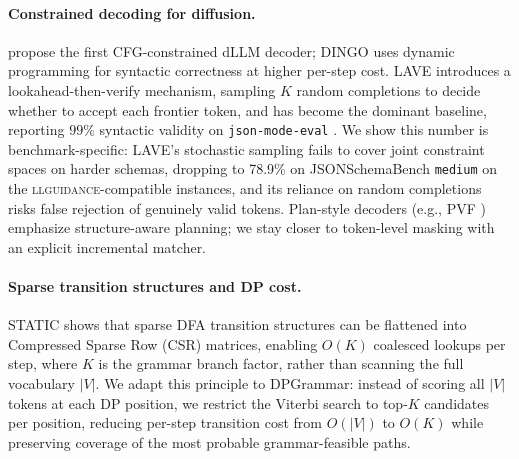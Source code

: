\paragraph{Constrained decoding for diffusion.}
\citet{cd4dllm} propose the first CFG-constrained dLLM decoder; DINGO \citep{suresh2025dingoconstrainedinferencediffusion} uses dynamic programming for syntactic correctness at higher per-step cost. LAVE \citep{zhang2026lookaheadthenverifyreliableconstraineddecoding} introduces a lookahead-then-verify mechanism, sampling $K$ random completions to decide whether to accept each frontier token, and has become the dominant baseline, reporting $99\%$ syntactic validity on \texttt{json-mode-eval} \citep{nousresearch2024jsonmodeeval}. We show this number is benchmark-specific: LAVE's stochastic sampling fails to cover joint constraint spaces on harder schemas, dropping to 78.9\% on JSONSchemaBench \citep{geng2025jsonschemabenchrigorousbenchmarkstructured} \texttt{medium} on the \textsc{llguidance}-compatible instances, and its reliance on random completions risks false rejection of genuinely valid tokens. Plan-style decoders (e.g., PVF \citep{li2026planverifyfillstructured}) emphasize structure-aware planning; we stay closer to token-level masking with an explicit incremental matcher.

\paragraph{Sparse transition structures and DP cost.}
STATIC \citep{su2026vectorizingtrieefficientconstrained} shows that sparse DFA transition structures can be flattened into Compressed Sparse Row (CSR) matrices, enabling $O(K)$ coalesced lookups per step, where $K$ is the grammar branch factor, rather than scanning the full vocabulary $|V|$. We adapt this principle to DPGrammar: instead of scoring all $|V|$ tokens at each DP position, we restrict the Viterbi search to top-$K$ candidates per position, reducing per-step transition cost from $O(|V|)$ to $O(K)$ while preserving coverage of the most probable grammar-feasible paths.


